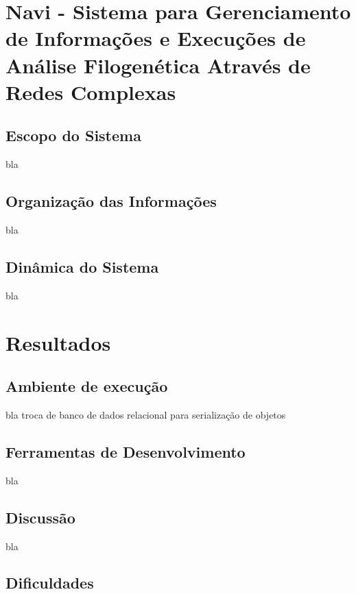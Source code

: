 \chapter{Navi - Sistema para Gerenciamento de Informações e Execuções de Análise Filogenética Através de Redes Complexas}
\label{cap:navi}

\section{Escopo do Sistema} \label{sec:escopo}

bla

\section{Organização das Informações} \label{sec:organizacao}

bla

\section{Dinâmica do Sistema} \label{sec:dinamica}

bla


\chapter{Resultados}
\label{cap:resultados}


\section{Ambiente de execução} \label{sec:ambiente}

bla
troca de banco de dados relacional para serialização de objetos

\section{Ferramentas de Desenvolvimento} \label{sec:ferramentas}

bla

\section{Discussão} \label{sec:discussao}

bla

\section{Dificuldades} \label{sec:dificuldades}


